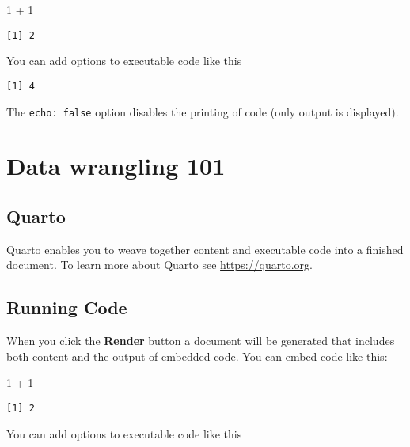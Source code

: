 \documentclass[
  letterpaper,
  DIV=11,
  numbers=noendperiod]{scrreprt}
\newenvironment{Shaded}{\begin{snugshade}}{\end{snugshade}}
\newcommand{\DecValTok}[1]{\textcolor[rgb]{0.68,0.00,0.00}{#1}}
\newcommand{\SpecialCharTok}[1]{\textcolor[rgb]{0.37,0.37,0.37}{#1}}
\begin{document}
\begin{Shaded}
\begin{Highlighting}[]
\DecValTok{1} \SpecialCharTok{+} \DecValTok{1}
\end{Highlighting}
\end{Shaded}

\begin{verbatim}
[1] 2
\end{verbatim}

You can add options to executable code like this

\begin{verbatim}
[1] 4
\end{verbatim}

The \texttt{echo:\ false} option disables the printing of code (only
output is displayed).

\hypertarget{data-wrangling-101}{%
\chapter{Data wrangling 101}\label{data-wrangling-101}}

\hypertarget{quarto-1}{%
\section{Quarto}\label{quarto-1}}

Quarto enables you to weave together content and executable code into a
finished document. To learn more about Quarto see
\url{https://quarto.org}.

\hypertarget{running-code-1}{%
\section{Running Code}\label{running-code-1}}

When you click the \textbf{Render} button a document will be generated
that includes both content and the output of embedded code. You can
embed code like this:

\begin{Shaded}
\begin{Highlighting}[]
\DecValTok{1} \SpecialCharTok{+} \DecValTok{1}
\end{Highlighting}
\end{Shaded}

\begin{verbatim}
[1] 2
\end{verbatim}

You can add options to executable code like this
\end{document}
